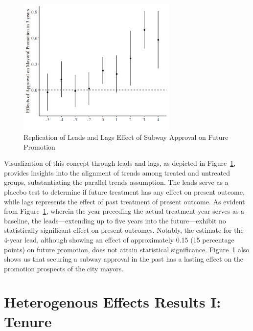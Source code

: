 \documentclass[12pt, ]{article}
\begin{document}
\begin{figure}[tbp]

{\centering \includegraphics[width=0.7\textwidth,height=\textheight]{figures/parallel_trends.png}

}

\caption{\label{fig-parallel}Replication of \citet{lei2022private} Leads
and Lags Effect of Subway Approval on Future Promotion}

\end{figure}

Visualization of this concept through leads and lags, as depicted in
Figure~\ref{fig-parallel}, provides insights into the alignment of
trends among treated and untreated groups, substantiating the parallel
trends assumption. The leads serve as a placebo test to determine if
future treatment has any effect on present outcome, while lags
represents the effect of past treatment of present outcome. As evident
from Figure~\ref{fig-parallel}, wherein the year preceding the actual
treatment year serves as a baseline, the leads---extending up to five
years into the future---exhibit no statistically significant effect on
present outcomes. Notably, the estimate for the 4-year lead, although
showing an effect of approximately 0.15 (15 percentage points) on future
promotion, does not attain statistical significance.
Figure~\ref{fig-parallel} also shows us that securing a subway approval
in the past has a lasting effect on the promotion prospects of the city
mayors.

\hypertarget{heterogenous-effects-results-i-tenure}{%
\section{Heterogenous Effects Results I:
Tenure}\label{heterogenous-effects-results-i-tenure}}
\end{document}
